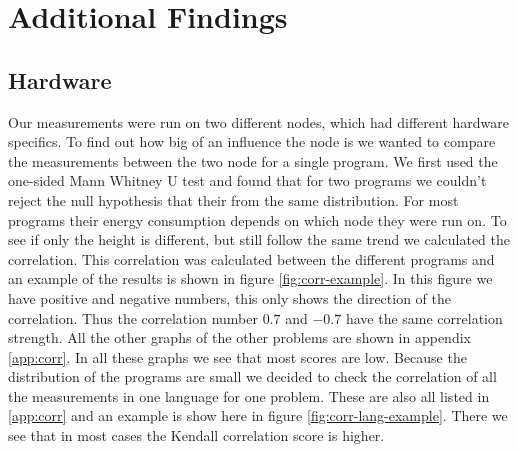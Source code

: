 \section{Additional Findings}
\subsection{Hardware}
Our measurements were run on two different nodes, which had different hardware specifics. To find out how big of an influence the node is we wanted to compare the measurements between the two node for a single program. We first used the one-sided Mann Whitney U test and found that for two programs we couldn't reject the null hypothesis that their from the same distribution. For most programs their energy consumption depends on which node they were run on. To see if only the height is different, but still follow the same trend we calculated the correlation. This correlation was calculated between the different programs and an example of the results is shown in figure \ref{fig:corr-example}. In this figure we have positive and negative numbers, this only shows the direction of the correlation. Thus the correlation number $0.7$ and $-0.7$ have the same correlation strength. All the other graphs of the other problems are shown in  appendix \ref{app:corr}. In all these graphs we see that most scores are low. Because the distribution of the programs are small we decided to check the correlation of all the measurements in one language for one problem. These are also all listed in \ref{app:corr} and an example is show here in figure \ref{fig:corr-lang-example}. There we see that in most cases the Kendall correlation score is higher.

